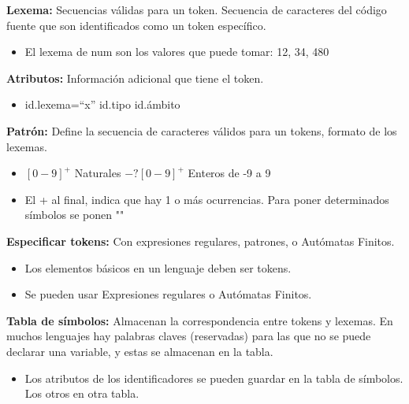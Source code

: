 \documentclass[12pt, twoside, openright]{report} %
\begin{document}
\textbf{Lexema:} Secuencias válidas para un token. Secuencia de
caracteres del código fuente que son identificados como un token
específico.

\begin{itemize}
	\item El lexema de num son los valores que puede tomar: 12, 34, 480
\end{itemize}

\textbf{Atributos:} Información adicional que tiene el token.

\begin{itemize}
	\item id.lexema=``x'' id.tipo id.ámbito
\end{itemize}

\textbf{Patrón:} Define la secuencia de caracteres válidos para un
tokens, formato de los lexemas.

\begin{itemize}
	\item \([0-9]^+\) Naturales \(-?[0-9]^+\) Enteros de -9 a 9
	\item El + al final, indica que hay 1 o más ocurrencias. Para poner
	      determinados símbolos se ponen ""
\end{itemize}

\textbf{Especificar tokens:} Con expresiones regulares, patrones, o
Autómatas Finitos.

\begin{itemize}
	\item Los elementos básicos en un lenguaje deben ser tokens.
	\item Se pueden usar Expresiones regulares o Autómatas Finitos.
\end{itemize}

\textbf{Tabla de símbolos:} Almacenan la correspondencia entre tokens y lexemas.
En muchos lenguajes hay palabras claves (reservadas) para las que no se puede declarar una variable, y estas se almacenan en la tabla.

\begin{itemize}
	\item Los atributos de los identificadores se pueden guardar en la tabla de
	      símbolos. Los otros en otra tabla.
\end{itemize}

\begin{figure}[H]
	{\def\svgwidth{.9\textwidth}
		}
\end{figure}
\end{document}
